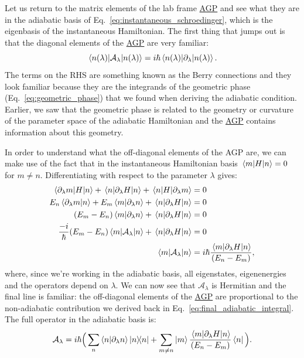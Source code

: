 \documentclass[a4paper,oneside,11pt]{book}
\newcommand{\dlambda}{\partial_{\lambda}}
\newcommand{\AGP}[1]{\mathcal{A}_{#1}}
\newcommand{\acrref}[1]{\hyperref[acr:#1]{#1}}
\begin{document}
    Let us return to the matrix elements of the lab frame \acrref{AGP} and see what they are in the adiabatic basis of Eq.~\eqref{eq:instantaneous_schroedinger}, which is the eigenbasis of the instantaneous Hamiltonian. The first thing that jumps out is that the diagonal elements of the \acrref{AGP} are very familiar:
    \begin{equation}\label{eq:AGP_diagonal}
        \mel{n(\lambda)}{\AGP{\lambda}}{n(\lambda)} = i\hbar \mel{n(\lambda)}{\dlambda}{n(\lambda)}.
    \end{equation}
    The terms on the RHS are something known as the Berry connections and they look familiar because they are the integrands of the geometric phase (Eq.~\eqref{eq:geometric_phase}) that we found when deriving the adiabatic condition. Earlier, we saw that the geometric phase is related to the geometry or curvature of the parameter space of the adiabatic Hamiltonian and the \acrref{AGP} contains information about this geometry. 

    In order to understand what the off-diagonal elements of the AGP are, we can make use of the fact that in the instantaneous Hamiltonian basis $\mel{m}{H}{n} = 0$ for $m \neq n$. Differentiating with respect to the parameter $\lambda$ gives:
    \begin{equation}\label{eq:differentiating_adiabatic_offdiagonals}
       \begin{aligned}
           \mel{\dlambda m}{H}{n} + \mel{n}{\dlambda H}{n} + \mel{n}{H}{\dlambda m} &= 0 \\
           E_n \braket{\dlambda m}{n} + E_m \braket{m}{\dlambda n} + \mel{n}{\dlambda H}{n} &= 0 \\
           (E_m - E_n) \braket{m}{\dlambda n} + \mel{n}{\dlambda H}{n} &= 0 \\
           \frac{-i}{\hbar} (E_m - E_n) \mel{m}{\AGP{\lambda}}{n} + \mel{n}{\dlambda H}{n} &= 0 \\
           \mel{m}{\AGP{\lambda}}{n} &= i\hbar \frac{\mel{m}{\dlambda H}{n}}{(E_n - E_m)},
       \end{aligned} 
    \end{equation}
    where, since we're working in the adiabatic basis, all eigenstates, eigenenergies and the operators depend on $\lambda$. We can now see that $\AGP{\lambda}$ is Hermitian and the final line is familiar: the off-diagonal elements of the \acrref{AGP} are proportional to the non-adiabatic contribution we derived back in Eq.~\eqref{eq:final_adiabatic_integral}. The full operator in the adiabatic basis is:
    \begin{equation}\label{eq:AGP_adiabatic_basis}
        \AGP{\lambda} = i\hbar\Big(\sum_n \braket{n}{\dlambda n} \dyad{n} + \sum_{m \neq n} \ket{m} \frac{\mel{m}{\dlambda H}{n}}{(E_n - E_m)} \bra{n} \Big).
    \end{equation}
\end{document}
